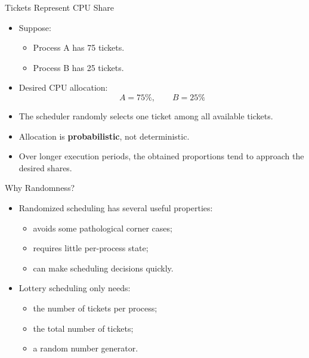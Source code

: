 \begin{frame}{Tickets Represent CPU Share}
    \begin{itemize}
        \item Suppose:
        \begin{itemize}
            \item Process A has 75 tickets.
            \item Process B has 25 tickets.
        \end{itemize}

        \item Desired CPU allocation:
        \[
            A = 75\%, \qquad B = 25\%
        \]

        \item The scheduler randomly selects one ticket among all available tickets.
        \item Allocation is \textbf{probabilistic}, not deterministic.
        \item Over longer execution periods, the obtained proportions tend to approach
        the desired shares.
    \end{itemize}
\end{frame}


\begin{frame}{Why Randomness?}
    \begin{itemize}
        \item Randomized scheduling has several useful properties:
        \begin{itemize}
            \item avoids some pathological corner cases;
            \item requires little per-process state;
            \item can make scheduling decisions quickly.
        \end{itemize}
        \item Lottery scheduling only needs:
        \begin{itemize}
            \item the number of tickets per process;
            \item the total number of tickets;
            \item a random number generator.
        \end{itemize}
    \end{itemize}
\end{frame}


